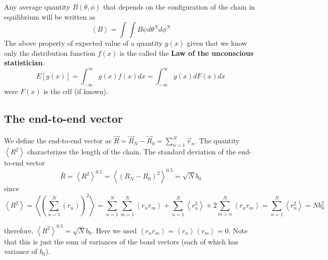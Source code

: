 \documentclass{report}
\begin{document}
Any average quantity $B(\theta,\phi)$ that depends on the configuration of the chain in equilibrium will be written as  
\begin{equation*}
\left< B\right>=\int\int B \psi d\theta^{N}d\phi^{N}
\end{equation*}
The above property of expected value of a quantity $g(x)$ given that we know only the distribution function $f(x)$ is the called the \textbf{Law of the unconscious statistician}.
\begin{equation*}
E[g(x)]=\int_{-\infty}^{\infty}g(x)f(x)dx = \int_{-\infty}^{\infty}g(x)dF(x)dx
\end{equation*} 
were $F(x)$ is the cdf (if known).

\subsection{The end-to-end vector}\label{subsection_theEndToEndVector}
We define the end-to-end vector as $\vec{R}=\vec{R}_N-\vec{R}_0=\sum_{n=1}^N \vec{r}_n$. The quantity $\left<R^2\right>$ characterizes the length of the chain. The standard deviation of the end-to-end vector
\begin{equation*}
\bar{R}=\left<R^2\right>^{0.5}=\left<(R_N-R_0)^2\right>^{0.5}=\sqrt{N}b_0
\end{equation*} 
since 
\begin{equation*}
\left<R^2\right> = \left<\left(\sum_{n=1}^N(r_n)\right)^2\right>=\sum_{n=1}^N\sum_{m=1}^N\left<r_nr_m\right>+\sum_{n=1}^N\left<r_n^2\right>+2\sum_{m>n}^N\left< r_nr_m\right>=\sum_{n=1}^N\left<r_n^2\right>=Nb_0^2
\end{equation*}

therefore, $\left<R^2\right>^{0.5}=\sqrt{N}b_0$. Here we used  $\left<r_nr_m\right>=\left<r_n\right>\left<r_m\right>=0$. Note that this is just the sum of variances of the bond vectors (each of which has variance of $b_0$).
\end{document}

